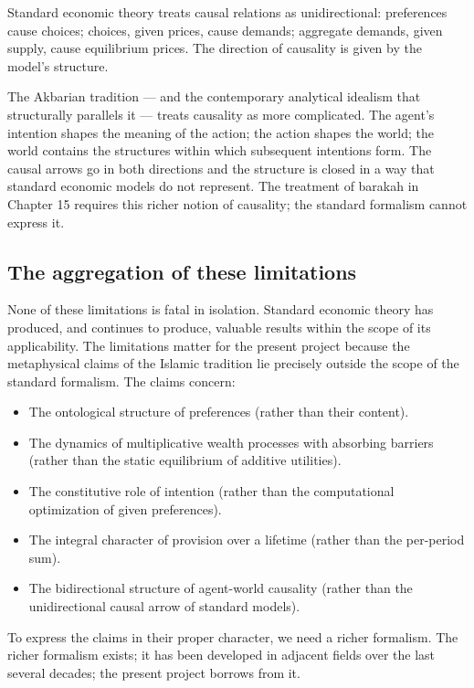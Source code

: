 Standard economic theory treats causal relations as unidirectional:
preferences cause choices; choices, given prices, cause demands;
aggregate demands, given supply, cause equilibrium prices. The
direction of causality is given by the model's structure.

The Akbarian tradition --- and the contemporary analytical idealism
that structurally parallels it --- treats causality as more
complicated. The agent's intention shapes the meaning of the action;
the action shapes the world; the world contains the structures within
which subsequent intentions form. The causal arrows go in both
directions and the structure is closed in a way that standard
economic models do not represent. The treatment of barakah in
Chapter 15 requires this richer notion of causality; the standard
formalism cannot express it.

\subsection{The aggregation of these limitations}

None of these limitations is fatal in isolation. Standard economic
theory has produced, and continues to produce, valuable results
within the scope of its applicability. The limitations matter for
the present project because the metaphysical claims of the Islamic
tradition lie precisely outside the scope of the standard formalism.
The claims concern:

\begin{itemize}[leftmargin=2em]
    \item The ontological structure of preferences (rather than
    their content).
    \item The dynamics of multiplicative wealth processes with
    absorbing barriers (rather than the static equilibrium of
    additive utilities).
    \item The constitutive role of intention (rather than the
    computational optimization of given preferences).
    \item The integral character of provision over a lifetime
    (rather than the per-period sum).
    \item The bidirectional structure of agent-world causality
    (rather than the unidirectional causal arrow of standard
    models).
\end{itemize}

To express the claims in their proper character, we need a richer
formalism. The richer formalism exists; it has been developed in
adjacent fields over the last several decades; the present project
borrows from it.

